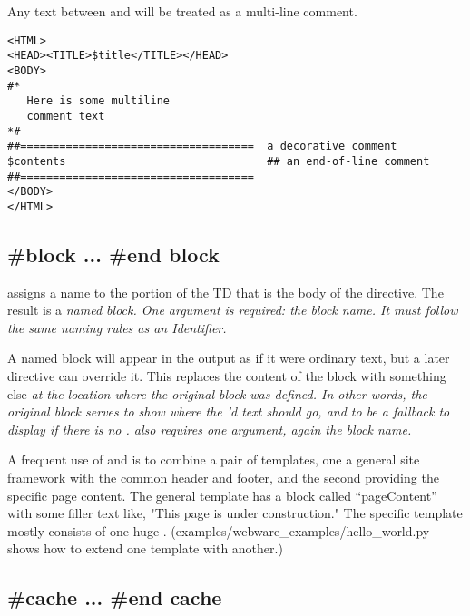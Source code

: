 {Any text between \code{\#*} and \code{*\#} will be treated as a multi-line
comment.
\begin{verbatim}
<HTML>
<HEAD><TITLE>$title</TITLE></HEAD>
<BODY>
#*
   Here is some multiline
   comment text
*#
##====================================  a decorative comment
$contents                               ## an end-of-line comment
##====================================
</BODY>
</HTML>
\end{verbatim}


\subsection{\#block ... \#end block}

 assigns a name to the portion of the TD that is the body of the
directive.   The result is a \em{named block}.  One argument is required: the
block name.  It must follow
the same naming rules as an Identifier.

A named block will appear in the output as if it were ordinary text, but a
later  directive can override it.  This replaces the content of
the block with something else \em{at the location where the original block was
defined}.  In other words, the original block serves to show \em{where} the
'd text should go, and to be a fallback to display if there is
no .   also requires one argument, again the
block name.

A frequent use of  and  is to combine a pair of
templates, one a general site framework with the common header and footer, and
the second providing the specific page content.  The general template has a
block called ``pageContent'' with some filler text like, "This page is under
construction."  The specific template mostly consists of one huge
.  (examples/webware\_examples/hello\_world.py shows how to
extend one template with another.)



\subsection{\#cache ... \#end cache}

}
